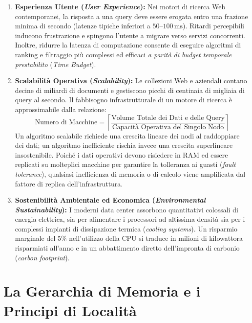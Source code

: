 \begin{enumerate}
    \item \textbf{Esperienza Utente (\textit{User Experience}):}
    Nei motori di ricerca Web contemporanei, la risposta a una query deve essere erogata entro una frazione minima di secondo (latenze tipiche inferiori a $50\text{--}100\,\text{ms}$). Ritardi percepibili inducono frustrazione e spingono l'utente a migrare verso servizi concorrenti. Inoltre, ridurre la latenza di computazione consente di eseguire algoritmi di ranking e filtraggio pi\`u complessi ed efficaci \emph{a parit\`a di budget temporale prestabilito} (\textit{Time Budget}).
    \item \textbf{Scalabilit\`a Operativa (\textit{Scalability}):}
    Le collezioni Web e aziendali contano decine di miliardi di documenti e gestiscono picchi di centinaia di migliaia di query al secondo. Il fabbisogno infrastrutturale di un motore di ricerca \`e approssimabile dalla relazione:
    \begin{equation}
    \text{Numero di Macchine} = \left\lceil \frac{\text{Volume Totale dei Dati e delle Query}}{\text{Capacit\`a Operativa del Singolo Nodo}} \right\rceil
    \end{equation}
    Un algoritmo scalabile richiede una crescita lineare dei nodi al raddoppiare dei dati; un algoritmo inefficiente rischia invece una crescita superlineare insostenibile. Poiché i dati operativi devono risiedere in RAM ed essere replicati su molteplici macchine per garantire la tolleranza ai guasti (\textit{fault tolerance}), qualsiasi inefficienza di memoria o di calcolo viene amplificata dal fattore di replica dell'infrastruttura.
    \item \textbf{Sostenibilit\`a Ambientale ed Economica (\textit{Environmental Sustainability}):}
    I moderni data center assorbono quantitativi colossali di energia elettrica, sia per alimentare i processori ad altissima densit\`a sia per i complessi impianti di dissipazione termica (\textit{cooling systems}). Un risparmio marginale del $5\%$ nell'utilizzo della CPU si traduce in milioni di kilowattora risparmiati all'anno e in un abbattimento diretto dell'impronta di carbonio (\textit{carbon footprint}).
\end{enumerate}

\FloatBarrier
\section{La Gerarchia di Memoria e i Principi di Localit\`a}
\label{sec:gerarchia-memoria-localita}

